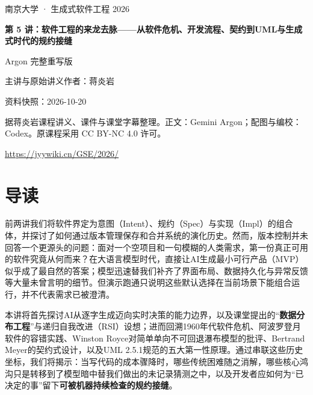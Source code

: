 \documentclass[UTF8,a4paper,11pt,fontset=fandol]{ctexart}
\begin{document}
\begin{titlepage}\centering\vspace*{25mm}

{\Large 南京大学 · 生成式软件工程 2026\par}\vspace{12mm}

{\Huge\bfseries 第 5 讲：软件工程的来龙去脉——从软件危机、开发流程、契约到UML与生成式时代的规约接缝\par}\vspace{10mm}

{\Large Argon 完整重写版\par}\vspace{10mm}

主讲与原始讲义作者：蒋炎岩\par

资料快照：2026-10-20\par\vfill

据蒋炎岩课程讲义、课件与课堂字幕整理。正文：Gemini Argon；配图与编校：Codex。原课程采用 CC BY-NC 4.0 许可。

\vspace{8mm}\url{https://jyywiki.cn/GSE/2026/}

\end{titlepage}

\tableofcontents\clearpage

\section*{导读}

前两讲我们将软件界定为意图（Intent）、规约（Spec）与实现（Impl）的组合体，并探讨了如何通过版本管理保存和合并系统的演化历史。然而，版本控制并未回答一个更源头的问题：面对一个空项目和一句模糊的人类需求，第一份真正可用的软件究竟从何而来？在大语言模型时代，直接让AI生成最小可行产品（MVP）似乎成了最自然的答案；模型迅速替我们补齐了界面布局、数据持久化与异常反馈等大量未曾言明的细节。但演示跑通只说明这些默认选择在当前场景下能组合运行，并不代表需求已被澄清。

本讲将首先探讨AI从逐字生成迈向实时决策的能力边界，以及课堂提出的“\textbf{数据分布工程}”与递归自我改进（RSI）设想；进而回溯1960年代软件危机、阿波罗登月软件的容错实践、Winston Royce对简单单向不可回退瀑布模型的批评、Bertrand Meyer的契约式设计，以及UML 2.5.1规范的五大第一性原理。通过串联这些历史坐标，我们将揭示：当写代码的成本骤降时，哪些传统困难随之消解，哪些核心鸿沟只是转移到了模型暗中替我们做出的未记录猜测之中，以及开发者应如何为“已决定的事”留下\textbf{可被机器持续检查的规约接缝}。
\end{document}
